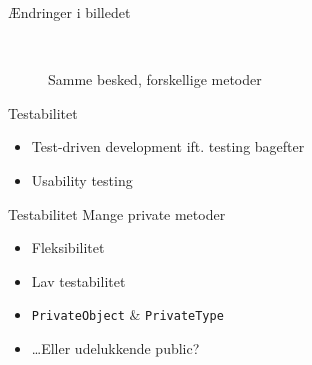 \begin{frame}{Ændringer i billedet}
    \begin{figure}
        \centering
        \begin{center}
        \end{center}
        ~
        ~
        \caption{Samme besked, forskellige metoder}
    \end{figure}
\end{frame}

\begin{frame}{Testabilitet}
    \begin{itemize}
        \item Test-driven development ift. testing bagefter
        \item Usability testing
    \end{itemize}
\end{frame}
\begin{frame}[fragile]{Testabilitet}
    Mange private metoder
    \begin{itemize}
        \item Fleksibilitet %
        \item Lav testabilitet
    \end{itemize}
    \begin{itemize}
        \item<1-> \lstinline|PrivateObject| \& \lstinline|PrivateType|
        \item<2-> \ldots Eller udelukkende public?
    \end{itemize}
\end{frame}

